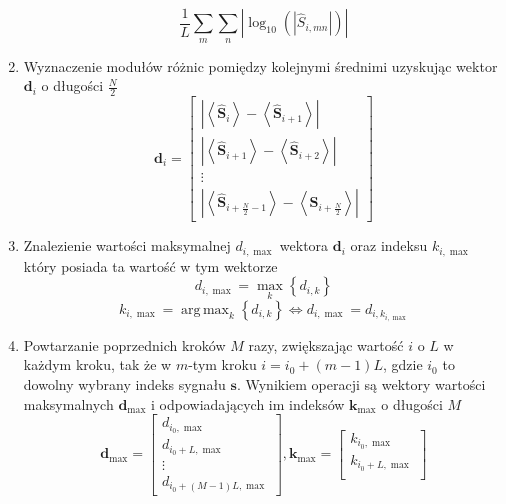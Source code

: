 \documentclass[pl,12pt]{aghdpl}
\DeclareMathOperator*{\argmax}{arg\,max}
\begin{document}
\begin{enumerate}
\begin{equation}
      \frac{1}{L}\sum_m\sum_n\left|\log_{10}
      \left(\left|\hat{S}_{i, mn}\right|\right)\right|
    \end{equation}
  \item Wyznaczenie modułów różnic pomiędzy kolejnymi średnimi uzyskując
    wektor $\bm d_i$ o długości $\frac{N}{2}$
    \begin{equation}
      \bm d_i = \begin{bmatrix}
        \left|\left<\hat{\bm S}_i\right> -
        \left<\hat{\bm S}_{i+1}\right>\right|\\
        \left|\left<\hat{\bm S}_{i+1}\right> -
        \left<\hat{\bm S}_{i+2}\right>\right|\\
        \vdots\\
        \left|\left<\hat{\bm S}_{i+\frac{N}{2}-1}\right> -
        \left<\hat{\bm S}_{i+\frac{N}{2}}\right>\right|
      \end{bmatrix}
    \end{equation}
    \item Znalezienie wartości maksymalnej $d_{i,\max}$ wektora $\bm d_i$ oraz
      indeksu $k_{i,\max}$ który posiada ta wartość w tym wektorze
      \begin{equation}
        d_{i,\max} = \max_k\left\{d_{i, k}\right\}
      \end{equation}
      \begin{equation}
        k_{i,\max} = \argmax_k\left\{d_{i,k}\right\} \iff d_{i,\max} =
        d_{i,k_{i,\max}}
      \end{equation}
    \item Powtarzanie poprzednich kroków $M$ razy, zwiększając wartość $i$ o $L$
      w każdym kroku, tak że w $m$-tym kroku $i = i_0 + (m-1)L$, gdzie $i_0$ to
      dowolny wybrany indeks sygnału $\bm s$. Wynikiem operacji są wektory
      wartości maksymalnych $\bm d_{\max}$ i odpowiadających im indeksów $\bm
      k_{\max}$ o długości $M$
      \begin{equation}
        \bm d_{\max} = \begin{bmatrix}
          d_{i_0,\max}\\
          d_{i_0+L,\max}\\
          \vdots\\
          d_{i_0+(M-1)L,\max}
        \end{bmatrix},
        \bm k_{\max} = \begin{bmatrix}
          k_{i_0,\max}\\
          k_{i_0+L,\max}\\

\end{bmatrix}
\end{equation}
\end{enumerate}
\end{document}
